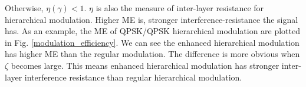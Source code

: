 \documentclass[10pt,fleqn, twocolumn]{IEEEtran}
\begin{document}
Otherwise, $\eta\left(\gamma\right)<1$. $\eta$ is also the measure
of inter-layer resistance for hierarchical modulation. Higher ME
is, stronger interference-resistance the signal has. As an
example, the ME of QPSK/QPSK hierarchical modulation are plotted
in Fig. \ref{modulation_efficiency}. We can see the enhanced
hierarchical modulation has higher ME than the regular modulation.
The difference is more obvious when $\zeta$ becomes large. This
means enhanced hierarchical modulation has stronger inter-layer
interference resistance than regular hierarchical modulation.
\begin{figure}
\end{figure}
\end{document}

